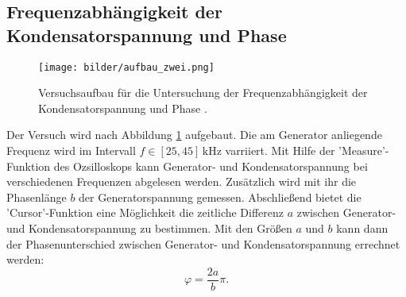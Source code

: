 \subsection{Frequenzabhängigkeit der Kondensatorspannung und Phase}
\begin{figure}
  \centering
  \texttt{[image: bilder/aufbau\_zwei.png]}
  \caption{Versuchsaufbau für die Untersuchung der Frequenzabhängigkeit der Kondensatorspannung und Phase \cite{anleitung354}. }
  \label{fig:aufbau_zwei}
\end{figure}
Der Versuch wird nach Abbildung \ref{fig:aufbau_zwei} aufgebaut.
Die am Generator anliegende Frequenz wird im Intervall $f\in\left[25,45\right]\,\si{\kilo\hertz}$
varriiert. Mit Hilfe der 'Measure'-Funktion des Ozsilloskops %
kann Generator- und Kondensatorspannung bei verschiedenen Frequenzen %
abgelesen werden. Zusätzlich wird mit ihr die Phasenlänge $b$ der Generatorspannung
gemessen. Abschließend bietet die 'Cursor'-Funktion eine Möglichkeit %
die zeitliche Differenz $a$ zwischen Generator- und Kondensatorspannung zu
bestimmen.
Mit den Größen $a$ und $b$ kann dann der Phasenunterschied zwischen
Generator- und Kondensatorspannung errechnet werden:
\begin{equation}
  \label{eq:phasen_unterschied}
  \varphi=\frac{2a}{b}\pi.
\end{equation}
